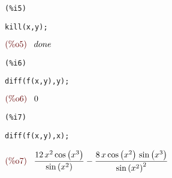 \documentclass[12pt]{article}
\begin{document}
\noindent
\begin{minipage}[t]{8ex}{\color{red}\bf
\begin{verbatim}
(%i5) 
\end{verbatim}}
\end{minipage}
\begin{minipage}[t]{\textwidth}{\color{blue}
\begin{verbatim}
kill(x,y);
\end{verbatim}}
\end{minipage}
\begin{math}\displaystyle
\parbox{8ex}{\color{labelcolor}(\%o5) }
done
\end{math}


\noindent
\begin{minipage}[t]{8ex}{\color{red}\bf
\begin{verbatim}
(%i6) 
\end{verbatim}}
\end{minipage}
\begin{minipage}[t]{\textwidth}{\color{blue}
\begin{verbatim}
diff(f(x,y),y);
\end{verbatim}}
\end{minipage}
\begin{math}\displaystyle
\parbox{8ex}{\color{labelcolor}(\%o6) }
0
\end{math}


\noindent
\begin{minipage}[t]{8ex}{\color{red}\bf
\begin{verbatim}
(%i7) 
\end{verbatim}}
\end{minipage}
\begin{minipage}[t]{\textwidth}{\color{blue}
\begin{verbatim}
diff(f(x,y),x);
\end{verbatim}}
\end{minipage}
\begin{math}\displaystyle
\parbox{8ex}{\color{labelcolor}(\%o7) }
\frac{12\,{x}^{2}\,\mathrm{cos}\left( {x}^{3}\right) }{\mathrm{sin}\left( {x}^{2}\right) }-\frac{8\,x\,\mathrm{cos}\left( {x}^{2}\right) \,\mathrm{sin}\left( {x}^{3}\right) }{{\mathrm{sin}\left( {x}^{2}\right) }^{2}}
\end{math}
\end{document}
